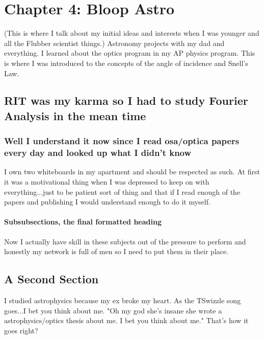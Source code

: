 \chapter{Chapter 4: Bloop Astro}

(This is where I talk about my initial ideas and interests when I was younger and all the Flubber scientist things.) Astronomy projects with my dad and everything. 
I learned about the optics program in my AP physics program. This is where I was introduced to the concepts of the angle of incidence and Snell's Law. 

\section[Shorter Title]{RIT was my karma so I had to study Fourier Analysis in the mean time}



\subsection{Well I understand it now since I read osa/optica papers every day and looked up what I didn't know}

I own two whiteboards in my apartment and should be respected as such. At first it was a motivational thing when I was depressed to keep on with everything...just to be patient sort of thing and that if I read enough of the papers and publishing I would understand enough to do it myself. 

\subsubsection{Subsubsections, the final formatted heading}

Now I actually have skill in these subjects out of the pressure to perform and honestly my network is full of men so I need to put them in their place. 

\section{A Second Section}

I studied astrophysics because my ex broke my heart. As the TSwizzle song goes...I bet you think about me. "Oh my god she's insane she wrote a astrophysics/optics thesis about me. I bet you think about me." That's how it goes right?